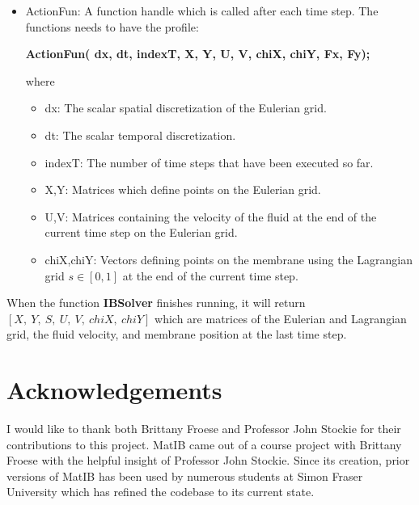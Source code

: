 \documentclass{article}
\begin{document}
\begin{itemize}
\item ActionFun: A function handle which is called after each time step. The functions
							needs to have the profile:\\
							\begin{center}{\bf ActionFun( dx, dt, indexT, X, Y, U, V, chiX, chiY, Fx, Fy);}\end{center}
							where 
							\begin{itemize}
								\item dx: The scalar spatial discretization of the Eulerian grid.
								\item dt: The scalar temporal discretization.
								\item indexT: The number of time steps that have been executed so far.
								\item X,Y: Matrices which define points on the Eulerian grid.
								\item U,V: Matrices containing the velocity of the fluid at the end of the current time step on the Eulerian grid. 
								\item chiX,chiY: Vectors defining points on the membrane using the Lagrangian grid $s\in[0,1]$ at the end of the 
										current time step.
							\end{itemize}
\end{itemize}
When the function {\bf IBSolver} finishes running, it will return $[X,~Y,~S,~U,~V,~chiX,~chiY]$ which are matrices of the Eulerian and Lagrangian grid,
the fluid velocity, and membrane position at the last time step.

\section{Acknowledgements}\label{sec:acknowledgements}

I would like to thank both Brittany Froese and Professor John Stockie for their contributions to this project. 
MatIB came out of a course project with Brittany Froese with the helpful insight of Professor John Stockie. 
Since its creation, prior versions of MatIB has been used by numerous students at Simon Fraser University 
which has refined the codebase to its current state.

\newpage



\end{document}
